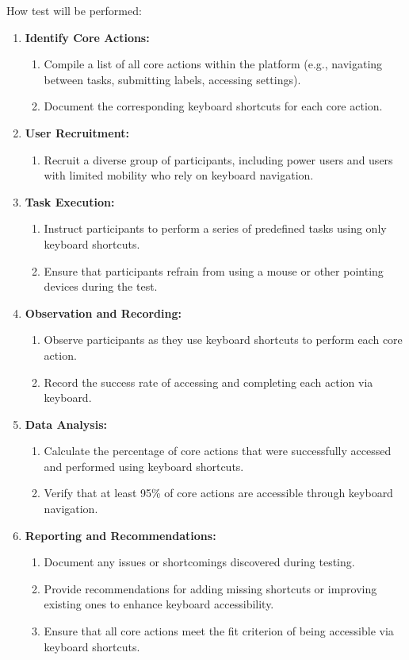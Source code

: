 \documentclass[12pt, titlepage]{article}
\begin{document}
\begin{enumerate}
How test will be performed:
\begin{enumerate}
    \item \textbf{Identify Core Actions:}
    \begin{enumerate}
        \item Compile a list of all core actions within the platform (e.g., navigating between tasks, submitting labels, accessing settings).
        \item Document the corresponding keyboard shortcuts for each core action.
    \end{enumerate}
    \item \textbf{User Recruitment:}
    \begin{enumerate}
        \item Recruit a diverse group of participants, including power users and users with limited mobility who rely on keyboard navigation.
    \end{enumerate}
    \item \textbf{Task Execution:}
    \begin{enumerate}
        \item Instruct participants to perform a series of predefined tasks using only keyboard shortcuts.
        \item Ensure that participants refrain from using a mouse or other pointing devices during the test.
    \end{enumerate}
    \item \textbf{Observation and Recording:}
    \begin{enumerate}
        \item Observe participants as they use keyboard shortcuts to perform each core action.
        \item Record the success rate of accessing and completing each action via keyboard.
    \end{enumerate}
    \item \textbf{Data Analysis:}
    \begin{enumerate}
        \item Calculate the percentage of core actions that were successfully accessed and performed using keyboard shortcuts.
        \item Verify that at least 95\% of core actions are accessible through keyboard navigation.
    \end{enumerate}
    \item \textbf{Reporting and Recommendations:}
    \begin{enumerate}
        \item Document any issues or shortcomings discovered during testing.
        \item Provide recommendations for adding missing shortcuts or improving existing ones to enhance keyboard accessibility.
        \item Ensure that all core actions meet the fit criterion of being accessible via keyboard shortcuts.
    \end{enumerate}
\end{enumerate}

\end{enumerate}
\end{document}

